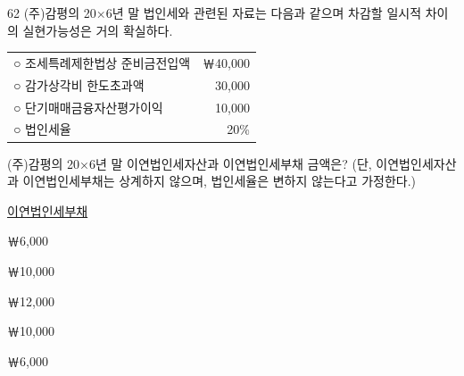 \begin{question}{62}
(주)감평의 20×6년 말 법인세와 관련된 자료는 다음과 같으며 차감할 일시적 차이의 실현가능성은 거의 확실하다.
\begin{framedtext}
\begin{tabularx}{\linewidth}{@{}Xr@{}}
○ 조세특례제한법상 준비금전입액 & ￦40,000 \\
○ 감가상각비 한도초과액 & 30,000 \\
○ 단기매매금융자산평가이익 & 10,000 \\
○ 법인세율 & 20\% \\
\end{tabularx}
\end{framedtext}
(주)감평의 20×6년 말 이연법인세자산과 이연법인세부채 금액은? (단, 이연법인세자산과 이연법인세부채는 상계하지 않으며, 법인세율은 변하지 않는다고 가정한다.)

\noindent\hspace*{2em}\uline{이연법인세부채}\par
\begin{choices}
  \item {}￦6,000
  \item {}￦10,000
  \item {}￦12,000
  \item {}￦10,000
  \item {}￦6,000
\end{choices}
\end{question}
